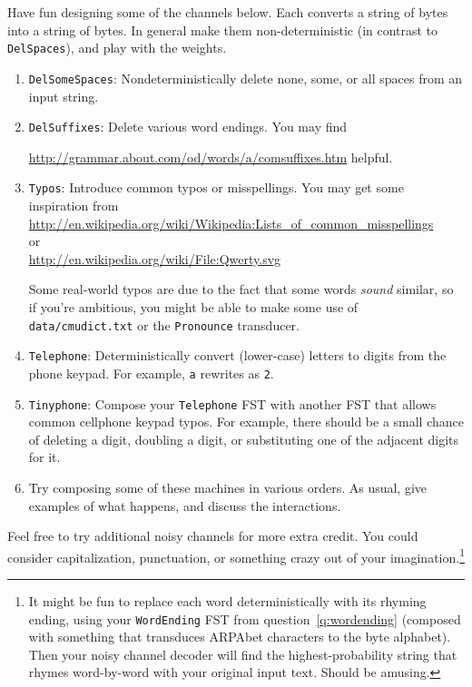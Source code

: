 \documentclass[11pt]{article}
\begin{document}
\begin{enumerate}[resume]
  Have fun designing some of the channels below.  Each converts a string of
  bytes into a string of bytes.  In general make them
  non-deterministic (in contrast to {\tt DelSpaces}), and play with
  the weights.

  \begin{enumerate}
  \item {\tt DelSomeSpaces}: Nondeterministically delete none,
    some, or all spaces from an input string.


  \item {\tt DelSuffixes}: Delete various word endings. You may find

      \url{http://grammar.about.com/od/words/a/comsuffixes.htm} helpful.

  \item {\tt Typos}: Introduce common typos or misspellings. You may
    get some inspiration from \\
    \url{http://en.wikipedia.org/wiki/Wikipedia:Lists_of_common_misspellings} \\
    or \\
    \url{http://en.wikipedia.org/wiki/File:Qwerty.svg}

    Some real-world typos are due to the fact that some words {\em sound}
    similar, so if you're ambitious, you might be able to make some
    use of {\tt data/cmudict.txt} or the {\tt Pronounce} transducer.

  \item {\tt Telephone}: Deterministically convert (lower-case)
    letters to digits from the phone keypad.  For example, {\tt a}
    rewrites as {\tt 2}.

  \item {\tt Tinyphone}: Compose your {\tt Telephone} FST with another
    FST that allows common cellphone keypad typos.  For example, there
    should be a small chance of deleting a digit, doubling a digit, or
    substituting one of the adjacent digits for it.


  \item Try composing some of these machines in various orders.  As usual,
    give examples of what happens, and discuss the interactions.
  \end{enumerate}

  Feel free to try additional noisy channels for more extra credit.  You
  could consider capitalization, punctuation, or something crazy out
  of your imagination.\footnote{It might be fun to replace each word
    deterministically with its rhyming ending, using your
    \texttt{WordEnding} FST from question~\ref{q:wordending}
    (composed with something that transduces ARPAbet characters to the
    byte alphabet).  Then your noisy channel decoder will find the
    highest-probability string that rhymes word-by-word with your
    original input text.  Should be amusing.}



\end{enumerate}
\end{document}
